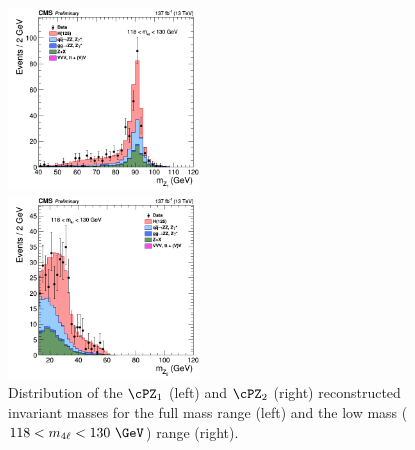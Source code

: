 {%
\begin{figure}[!htb]
	\vspace*{0.3cm}
	\begin{center}
		\includegraphics[width=0.450\textwidth]{Figures/KinDistr/MZ1_M4L118130_Unblinded_4l_InclusiveRun2.png} \\ %
		\includegraphics[width=0.450\textwidth]{Figures/KinDistr/MZ2_M4L118130_Unblinded_4l_InclusiveRun2.png} \\ %
			Distribution of the $\cPZ_1$ (left) and  $\cPZ_2$ (right) reconstructed invariant masses for the full mass range (left) and the low mass ($118<\mllll<130~\GeV$) range (right). 

\end{center}
\end{figure}}
